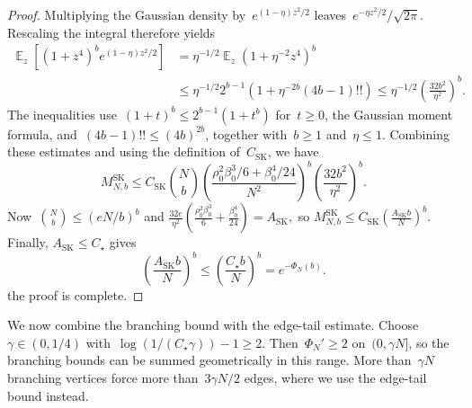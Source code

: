 \documentclass[letterpaper,11pt,reqno]{amsart}
\renewcommand{\leq}{\leqslant}
\renewcommand{\geq}{\geqslant}
\DeclareMathOperator{\E}{\mathds{E}}
\begin{document}
\begin{proof}
Multiplying the Gaussian density by~$e^{(1-\eta)z^2/2}$ leaves~$e^{-\eta z^2/2}/\sqrt{2\pi}$. Rescaling the integral therefore yields
\begin{align*}
\E_z\!\left[(1+z^4)^b e^{(1-\eta)z^2/2}\right]
&=\eta^{-1/2}\E_z(1+\eta^{-2}z^4)^b\\
&\leq\eta^{-1/2}2^{b-1}\left(1+\eta^{-2b}(4b-1)!!\right)
\leq\eta^{-1/2}\left(\frac{32b^2}{\eta^2}\right)^b.
\end{align*}
The inequalities use~$(1+t)^b\leq2^{b-1}(1+t^b)$ for~$t\geq0$, the Gaussian moment formula, and~$(4b-1)!!\leq(4b)^{2b}$, together with~$b\geq1$ and~$\eta\leq1$.
Combining these estimates and using the definition of~$C_{\mathrm{SK}}$, we have
\begin{equation*}
M^{\mathrm{SK}}_{N,b}\leq C_{\mathrm{SK}}\binom Nb
\left(\frac{\rho_0^2\beta_0^3/6+\beta_0^4/24}{N^2}\right)^b
\left(\frac{32b^2}{\eta^2}\right)^b.
\end{equation*}
Now~$\binom Nb\leq(eN/b)^b$ and
\(
\frac{32e}{\eta^2}
\left(\frac{\rho_0^2\beta_0^3}{6}+\frac{\beta_0^4}{24}\right)
=A_{\mathrm{SK}},
\)
so
\(
M^{\mathrm{SK}}_{N,b}\leq C_{\mathrm{SK}}\left(\frac{A_{\mathrm{SK}}b}{N}\right)^b.
\)
Finally, $A_{\mathrm{SK}}\leq C_\star$ gives
\begin{equation*}
\left(\frac{A_{\mathrm{SK}}b}{N}\right)^b
\leq\left(\frac{C_\star b}{N}\right)^b
=e^{-\Phi_N(b)}.
\end{equation*}
the proof is complete.
\end{proof}

We now combine the branching bound with the edge-tail estimate. Choose~$\gamma\in(0,1/4)$ with~$\log(1/(C_\star\gamma))-1\geq2$. Then~$\Phi_N'\geq2$ on~$(0,\gamma N]$, so the branching bounds can be summed geometrically in this range. More than~$\gamma N$ branching vertices force more than~$3\gamma N/2$ edges, where we use the edge-tail bound instead.
\end{document}
